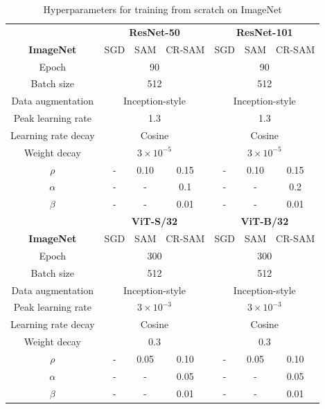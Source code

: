\documentclass[letterpaper]{article} %
\theoremstyle{plain}
\theoremstyle{definition}
\begin{document}
 \begin{table}[h!]
\caption{\footnotesize Hyperparameters for training from scratch on ImageNet}
  \centering
  \small
  \begin{tabular}{c|ccc|ccc}
  \toprule
     & \multicolumn{3}{c|}{\textbf{ResNet-50 }} & \multicolumn{3}{c}{ \textbf{ResNet-101}} \\
   \textbf{ImageNet }  & SGD & SAM &CR-SAM& SGD & SAM &CR-SAM\\
   \midrule
   Epoch&\multicolumn{3}{c|}{90}&\multicolumn{3}{c}{90}\\
   Batch size&\multicolumn{3}{c|}{512}&\multicolumn{3}{c}{512}\\
   Data augmentation &\multicolumn{3}{c|}{Inception-style}&\multicolumn{3}{c}{Inception-style}\\
   Peak learning rate &\multicolumn{3}{c|}{1.3}&\multicolumn{3}{c}{1.3}\\
   Learning rate decay &\multicolumn{3}{c|}{Cosine}&\multicolumn{3}{c}{Cosine}\\
   Weight decay &\multicolumn{3}{c}{$3\times10^{-5}$}&\multicolumn{3}{c}{$3\times10^{-5}$}\\
   $\rho$ & -&0.10&0.15&-&0.10&0.15\\
   $\alpha$ &-&-&0.1&-&-&0.2\\
   $\beta$ &-&-&0.01&-&-&0.01\\
\midrule
   & \multicolumn{3}{c|}{\textbf{ViT-S/32}} & \multicolumn{3}{c}{ \textbf{ViT-B/32}} \\
   \textbf{ImageNet }  & SGD & SAM &CR-SAM& SGD & SAM &CR-SAM\\
   \midrule
   Epoch&\multicolumn{3}{c|}{300}&\multicolumn{3}{c}{300}\\
   Batch size&\multicolumn{3}{c|}{512}&\multicolumn{3}{c}{512}\\
   Data augmentation &\multicolumn{3}{c|}{Inception-style}&\multicolumn{3}{c}{Inception-style}\\
   Peak learning rate &\multicolumn{3}{c}{$3\times10^{-3}$}&\multicolumn{3}{c}{$3\times10^{-3}$}\\
   Learning rate decay &\multicolumn{3}{c|}{Cosine}&\multicolumn{3}{c}{Cosine}\\
   Weight decay &\multicolumn{3}{c}{0.3}&\multicolumn{3}{c}{0.3}\\
   $\rho$ & -&0.05&0.10&-&0.05&0.10\\
   $\alpha$ &-&-&0.05&-&-&0.05\\
   $\beta$ &-&-&0.01&-&-&0.01\\

    \bottomrule

  \end{tabular}

  \label{tab:hyper_imgnet}
\end{table}
\end{document}
